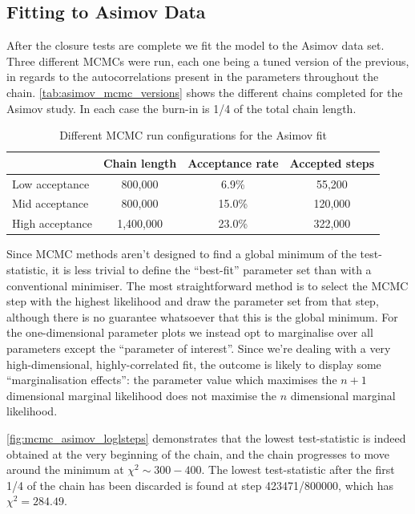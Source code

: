 \subsection{Fitting to Asimov Data}
\label{sec:asimov_fit}
After the closure tests are complete we fit the model to the Asimov data set. Three different MCMCs were run, each one being a tuned version of the previous, in regards to the autocorrelations present in the parameters throughout the chain. \autoref{tab:asimov_mcmc_versions} shows the different chains completed for the Asimov study. In each case the burn-in is 1/4 of the total chain length.
\begin{table}[h]
	\centering
	\begin{tabular}{l | c c c}
		\hline
		\hline
							& Chain length  & Acceptance rate & Accepted steps\\
							\hline
		Low acceptance		& 800,000		& 6.9\% 		  & 55,200 \\
		Mid acceptance		& 800,000		& 15.0\% 		  & 120,000\\
		High acceptance		& 1,400,000		& 23.0\%  		  & 322,000 \\
		\hline
		\hline
	\end{tabular}
\caption{Different MCMC run configurations for the Asimov fit}
\label{tab:asimov_mcmc_versions}
\end{table}

Since MCMC methods aren't designed to find a global minimum of the test-statistic, it is less trivial to define the ``best-fit'' parameter set than with a conventional minimiser. The most straightforward method is to select the MCMC step with the highest likelihood and draw the parameter set from that step, although there is no guarantee whatsoever that this is the global minimum. For the one-dimensional parameter plots we instead opt to marginalise over all parameters except the ``parameter of interest''. Since we're dealing with a very high-dimensional, highly-correlated fit, the outcome is likely to display some ``marginalisation effects'': the parameter value which maximises the $n+1$ dimensional marginal likelihood does not maximise the $n$ dimensional marginal likelihood.

\autoref{fig:mcmc_asimov_loglsteps} demonstrates that the lowest test-statistic is indeed obtained at the very beginning of the chain, and the chain progresses to move around the minimum at $\chi^2 \sim 300-400$. The lowest test-statistic after the first 1/4 of the chain has been discarded is found at step 423471/800000, which has $\chi^2 = 284.49$.

